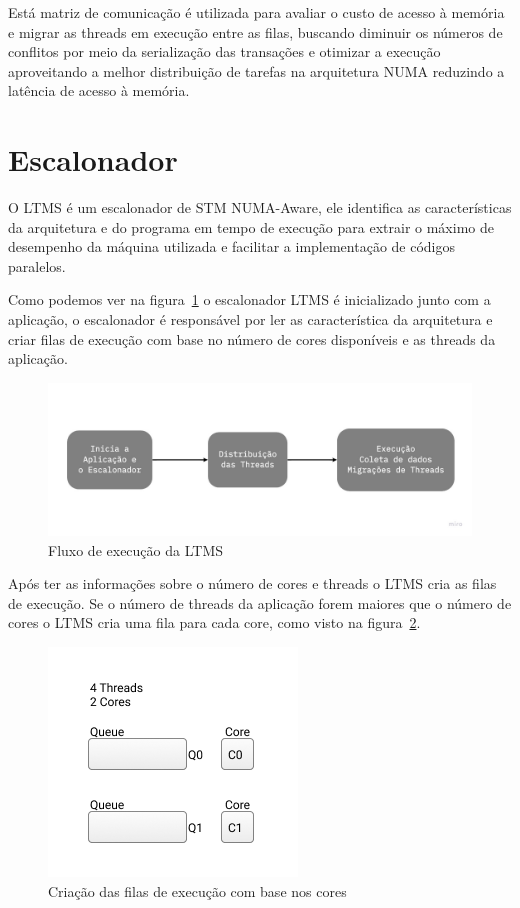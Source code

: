\documentclass[diss,capa]{texufpel}
\begin{document}
Está matriz de comunicação é utilizada para avaliar o custo de acesso à memória e migrar as threads em execução entre as filas, buscando diminuir os números de conflitos por meio da serialização das transações e otimizar a execução aproveitando a melhor distribuição de tarefas na arquitetura NUMA reduzindo a latência de acesso à memória.

\section{\textbf{Escalonador}}

O LTMS é um escalonador de STM NUMA-Aware, ele identifica as características da arquitetura e do programa em tempo de execução para extrair o máximo de desempenho da máquina utilizada e facilitar a implementação de códigos paralelos.

Como podemos ver na figura~\ref{ltms_generic} o escalonador LTMS é inicializado junto com a aplicação, o escalonador é responsável por ler as característica da arquitetura e criar filas de execução com base no número de cores disponíveis e as threads da aplicação.

\begin{figure}[htbp]
  \centering \includegraphics[scale=.25]{images/ltms_generic}
\caption{Fluxo de execução da LTMS} 
\label{ltms_generic}
\end{figure}

Após ter as informações sobre o número de cores e threads o LTMS cria as filas de execução. Se o número de threads da aplicação forem maiores que o número de cores o LTMS cria uma fila para cada core, como visto na figura~\ref{queue_core}.

\begin{figure}[htbp]
  \centering
  \includegraphics[scale=.8]{images/Queue_core.png}
  \caption{Criação das filas de execução com base nos cores}
\label{queue_core}
\end{figure}
\end{document}
